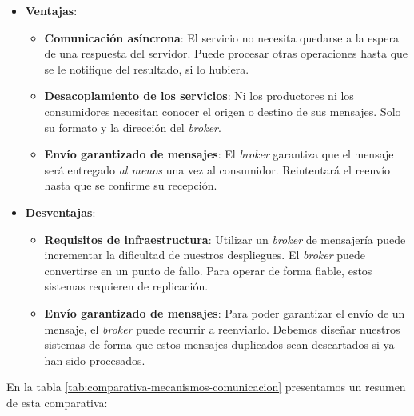 \begin{itemize}
  \item \textbf{Ventajas}:

  \begin{itemize}
    \item \textbf{Comunicación asíncrona}: El servicio no necesita quedarse a la espera de una respuesta del servidor. Puede procesar otras operaciones hasta que se le notifique del resultado, si lo hubiera.

    \item \textbf{Desacoplamiento de los servicios}: Ni los productores ni los consumidores necesitan conocer el origen o destino de sus mensajes. Solo su formato y la dirección del \emph{broker}.

    \item \textbf{Envío garantizado de mensajes}: El \emph{broker} garantiza que el mensaje será entregado \emph{al menos} una vez al consumidor. Reintentará el reenvío hasta que se confirme su recepción.

  \end{itemize}

  \item \textbf{Desventajas}:

  \begin{itemize}
    \item \textbf{Requisitos de infraestructura}: Utilizar un \emph{broker} de mensajería puede incrementar la dificultad de nuestros despliegues. El \emph{broker} puede convertirse en un punto de fallo. Para operar de forma fiable, estos sistemas requieren de replicación. \cite{newmanBuildingMicroservicesDesigning2021}

    \item \textbf{Envío garantizado de mensajes}: Para poder garantizar el envío de un mensaje, el \emph{broker} puede recurrir a reenviarlo. Debemos diseñar nuestros sistemas de forma que estos mensajes duplicados sean descartados si ya han sido procesados.
  \end{itemize}
\end{itemize}

En la tabla \ref{tab:comparativa-mecanismos-comunicacion} presentamos un resumen de esta comparativa:

